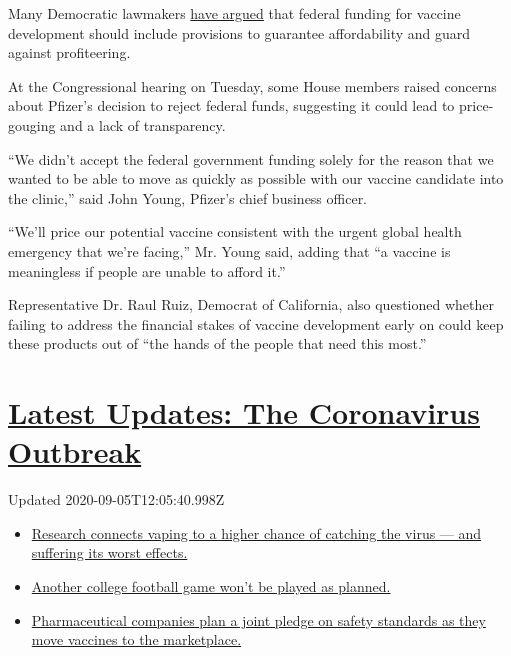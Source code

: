 Many Democratic lawmakers
\href{https://www.nytimes3xbfgragh.onion/2020/06/03/us/politics/coronavirus-vaccine-trump-moderna.html}{have
argued} that federal funding for vaccine development should include
provisions to guarantee affordability and guard against profiteering.

At the Congressional hearing on Tuesday, some House members raised
concerns about Pfizer's decision to reject federal funds, suggesting it
could lead to price-gouging and a lack of transparency.

``We didn't accept the federal government funding solely for the reason
that we wanted to be able to move as quickly as possible with our
vaccine candidate into the clinic,'' said John Young, Pfizer's chief
business officer.

``We'll price our potential vaccine consistent with the urgent global
health emergency that we're facing,'' Mr. Young said, adding that ``a
vaccine is meaningless if people are unable to afford it.''

Representative Dr. Raul Ruiz, Democrat of California, also questioned
whether failing to address the financial stakes of vaccine development
early on could keep these products out of ``the hands of the people that
need this most.''

\hypertarget{latest-updates-the-coronavirus-outbreak}{%
\section{\texorpdfstring{\href{https://www.nytimes3xbfgragh.onion/2020/09/04/world/covid-19-coronavirus.html?action=click\&pgtype=Article\&state=default\&region=MAIN_CONTENT_1\&context=storylines_live_updates}{Latest
Updates: The Coronavirus
Outbreak}}{Latest Updates: The Coronavirus Outbreak}}\label{latest-updates-the-coronavirus-outbreak}}

Updated 2020-09-05T12:05:40.998Z

\begin{itemize}
\tightlist
\item
  \href{https://www.nytimes3xbfgragh.onion/2020/09/04/world/covid-19-coronavirus.html?action=click\&pgtype=Article\&state=default\&region=MAIN_CONTENT_1\&context=storylines_live_updates\#link-1654f6ad}{Research
  connects vaping to a higher chance of catching the virus --- and
  suffering its worst effects.}
\item
  \href{https://www.nytimes3xbfgragh.onion/2020/09/04/world/covid-19-coronavirus.html?action=click\&pgtype=Article\&state=default\&region=MAIN_CONTENT_1\&context=storylines_live_updates\#link-52e4198a}{Another
  college football game won't be played as planned.}
\item
  \href{https://www.nytimes3xbfgragh.onion/2020/09/04/world/covid-19-coronavirus.html?action=click\&pgtype=Article\&state=default\&region=MAIN_CONTENT_1\&context=storylines_live_updates\#link-181cef0}{Pharmaceutical
  companies plan a joint pledge on safety standards as they move
  vaccines to the marketplace.}
\end{itemize}

